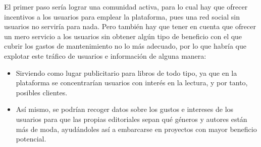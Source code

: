 El primer paso sería lograr una comunidad activa, para lo cual hay que ofrecer incentivos a los usuarios para emplear la plataforma, pues una red social sin usuarios no serviría para nada. Pero también hay que tener en cuenta que ofrecer un mero servicio a los usuarios sin obtener algún tipo de beneficio con el que cubrir los gastos de mantenimiento no lo más adecuado, por lo que habría que explotar este tráfico de usuarios e información de alguna manera:

\begin{itemize}
    \item Sirviendo como lugar publicitario para libros de todo tipo, ya que en la plataforma se concentrarían usuarios con interés en la lectura, y por tanto, posibles clientes.
    \item Así mismo, se podrían recoger datos sobre los gustos e intereses de los usuarios para que las propias editoriales sepan qué géneros y autores están más de moda, ayudándoles así a embarcarse en proyectos con mayor beneficio potencial.
\end{itemize} 

